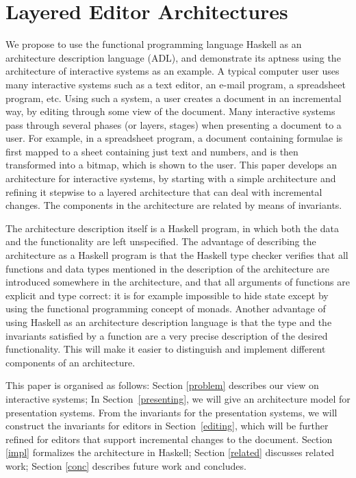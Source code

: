 

\chapter{Layered Editor Architectures}
\label{chap:layeredArchs}


 


 

We propose to use the functional programming language Haskell as an architecture description language (ADL), and demonstrate its aptness using the architecture of interactive systems as an example. A typical computer user uses many interactive systems such as a text editor, an e-mail program, a spreadsheet program, etc. Using such a system, a user creates a document in an incremental way, by editing through some view of the document. Many interactive systems pass through several phases (or layers, stages) when presenting a document to a user. For example, in a spreadsheet program, a document containing formulae is first mapped to a sheet containing just text and numbers, and is then transformed into a bitmap, which is shown to the user. This paper develops an architecture for interactive systems, by starting with a simple architecture and refining it stepwise to a layered architecture that can deal with incremental changes. The components in the architecture are related by means of invariants.

The architecture description itself is a Haskell program, in which both the data and the functionality are left unspecified. The advantage of describing the architecture as a Haskell program is that the Haskell type checker verifies that all functions and data types mentioned in the description of the architecture are introduced somewhere in the architecture, and that all arguments of functions are explicit and type correct: it is for example impossible to hide state except by using the functional programming concept of monads. Another advantage of using Haskell as an architecture description language is that the type and the invariants satisfied by a function are a very precise description of the desired functionality. This will make it easier to distinguish and implement different components of an architecture.

This paper is organised as follows: Section \ref{problem} describes our view on interactive systems; In Section~\ref{presenting}, we will give an architecture model for presentation systems. From the invariants for the presentation systems, we will construct the invariants for editors in Section~\ref{editing}, which will be further refined for editors that support incremental changes to the document. Section \ref{impl} formalizes the architecture in Haskell; Section \ref{related} discusses related work; Section \ref{conc} describes future work and concludes.
